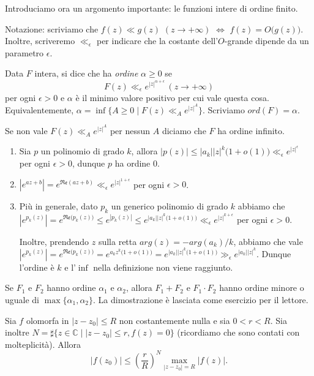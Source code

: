 Introduciamo ora un argomento importante: le funzioni intere di ordine finito.

Notazione: scriviamo che $f(z) \ll g(z)$ $(z \longrightarrow +\infty)$ $\iff$ $f(z)=O\big(g(z)\big)$. Inoltre, scriveremo $\ll_{\epsilon}$ per indicare che la costante dell'$O$-grande dipende da un parametro $\epsilon$.

\begin{defn}
  Data $F$ intera, si dice che ha \textit{ordine} $\alpha \ge 0$ se
  $$F(z) \ll_{\epsilon} e^{|z|^{\alpha+\epsilon}} \, (z \longrightarrow +\infty)$$
  per ogni $\epsilon>0$ e $\alpha$ è il minimo valore positivo per cui vale questa cosa. Equivalentemente, $\alpha=\inf\{A \ge 0 \mid F(z) \ll_A e^{|z|^A}\}$. Scriviamo $ord(F)=\alpha$.

  Se non vale $F(z) \ll_A e^{|z|^A}$ per nessun $A$ diciamo che $F$ ha ordine infinito.
\end{defn}

\begin{ex}
  \begin{enumerate}
    \item Sia $p$ un polinomio di grado $k$, allora $|p(z)| \le |a_k||z|^k\big(1+o(1)\big) \ll_{\epsilon} e^{|z|^{\epsilon}}$ per ogni $\epsilon>0$, dunque $p$ ha ordine $0$.
    \item $|e^{az+b}|=e^{\mathfrak{Re}(az+b)} \ll_{\epsilon} e^{|z|^{1+\epsilon}}$ per ogni $\epsilon>0$.
    \item Più in generale, dato $p_k$ un generico polinomio di grado $k$ abbiamo che $|e^{p_k(z)}|=e^{\mathfrak{Re}\big(p_k(z)\big)} \le e^{|p_k(z)|} \le e^{|a_k||z|^k\big(1+o(1)\big)} \ll_{\epsilon} e^{|z|^{k+\epsilon}}$ per ogni $\epsilon>0$.

    Inoltre, prendendo $z$ sulla retta $arg(z)=-arg(a_k)/k$, abbiamo che vale $|e^{p_k(z)}|=e^{\mathfrak{Re}\big(p_k(z)\big)}=e^{a_kz^k\big(1+o(1)\big)}=e^{|a_k||z|^k\big(1+o(1)\big)} \gg_{\epsilon} e^{|a_k||z|^k}$. Dunque l'ordine è $k$ e l'$\inf$ nella definizione non viene raggiunto.
  \end{enumerate}
\end{ex}

\begin{oss}
  Se $F_1$ e $F_2$ hanno ordine $\alpha_1$ e $\alpha_2$, allora $F_1+F_2$ e $F_1 \cdot F_2$ hanno ordine minore o uguale di $\max\{\alpha_1,\alpha_2\}$. La dimostrazione è lasciata come esercizio per il lettore.
\end{oss}

\begin{lm} \label{1.2.4}
  Sia $f$ olomorfa in $|z-z_0| \le R$ non costantemente nulla e sia $0<r<R$. Sia inoltre $N=\sharp\{z \in \mathbb{C} \mid |z-z_0| \le r, f(z)=0\}$ (ricordiamo che sono contati con molteplicità). Allora
  $$|f(z_0)| \le \left(\frac{r}{R}\right)^N\max_{|z-z_0|=R}|f(z)|.$$
\end{lm}

